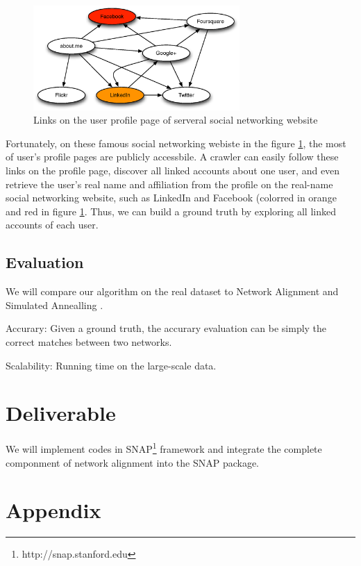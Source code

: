 \documentclass[11pt,letterpaper]{article}
\begin{document}
\begin{figure}[h!]
\centering
\caption{Links on the user profile page of serveral social networking website}
\label{fig:infer}
\includegraphics[width=0.7\textwidth]{infer.eps}
\end{figure}


Fortunately, on these famous social networking webiste in the figure \ref{fig:infer}, the most of user's profile pages are publicly accessbile. A crawler can easily follow these links on the profile page, discover all linked accounts about one user, and even retrieve the user's real name and affiliation from the profile on the real-name social networking website, such as LinkedIn and Facebook (colorred in orange and red in figure \ref{fig:infer}. Thus, we can build a ground truth by exploring all linked accounts of each user. 

\subsection{Evaluation}

We will compare our algorithm on the real dataset to Network Alignment \cite{Narayanan2008} and Simulated Annealling \cite{Kreitmann2011}. 

Accurary: Given a ground truth, the accurary evaluation can be simply the correct matches between two networks. 

Scalability: Running time on the large-scale data.

\section{Deliverable}
We will implement codes in SNAP\footnote{http://snap.stanford.edu} framework and integrate the complete componment of network alignment into the SNAP package.  


\nocite{Ding2010,Wanga,Peng2012,Klau2009,Wondracek2010,Balduzzi2010,Koutra2011,Bayati2009,Bradde2010,Cromi2009,Flannick2009,Memisevic2012,Kreitmann2011,Narayanan2009,Delcher2002,Kollias2012,Mohammadi,Kuchaiev2007,Wangb,Liao2009,El-Kebir2011,Shi,Bayati2009a,Pache2012,Pache2012a,Kollias2011,Doan,Bayatia,Koyuturk2006,Todor2007,Narayanan2008,Burkhart2010,Backstrom2007}





\section{Appendix}
\end{document}
